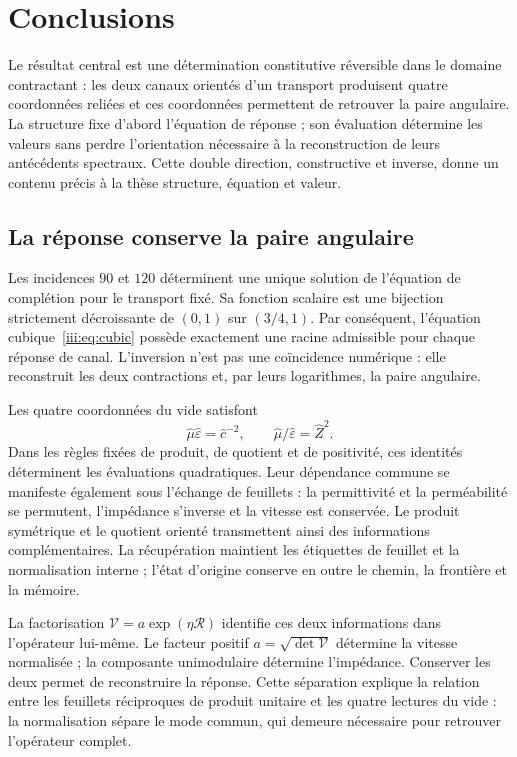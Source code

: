 \section{Conclusions}
\label{iii:sec:conclusiones}
\begingroup
\fontsize{10.5}{12.8}\selectfont
\setlength{\parskip}{2pt plus .5pt minus .5pt}

Le résultat central est une détermination constitutive réversible dans
le domaine contractant : les deux canaux orientés d’un transport
produisent quatre coordonnées reliées et ces coordonnées permettent de
retrouver la paire angulaire. La structure fixe d’abord l’équation de
réponse ; son évaluation détermine les valeurs sans perdre l’orientation
nécessaire à la reconstruction de leurs antécédents spectraux. Cette double
direction, constructive et inverse, donne un contenu précis à la thèse
structure, équation et valeur.

\subsection*{La réponse conserve la paire angulaire}

Les incidences $90$ et $120$ déterminent une unique solution de
l’équation de complétion pour le transport fixé. Sa fonction scalaire
est une bijection strictement décroissante de $(0,1)$ sur $(3/4,1)$.
Par conséquent, l’équation cubique~\eqref{iii:eq:cubic} possède exactement
une racine admissible pour chaque réponse de canal. L’inversion n’est pas
une coïncidence numérique : elle reconstruit les deux contractions et, par
leurs logarithmes, la paire angulaire.

Les quatre coordonnées du vide satisfont
\[
\widehat\mu\widehat\varepsilon=\widehat c^{-2},\qquad
\widehat\mu/\widehat\varepsilon=\widehat Z^2.
\]
Dans les règles fixées de produit, de quotient et de positivité, ces
identités déterminent les évaluations quadratiques. Leur dépendance
commune se manifeste également sous l’échange de feuillets : la permittivité et
la perméabilité se permutent, l’impédance s’inverse et la vitesse est
conservée. Le produit symétrique et le quotient orienté transmettent ainsi
des informations complémentaires. La récupération maintient les étiquettes
de feuillet et la normalisation interne ; l’état d’origine conserve
en outre le chemin, la frontière et la mémoire.

La factorisation $\mathcal V=a\exp(\eta\mathcal R)$ identifie
ces deux informations dans l’opérateur lui-même. Le facteur positif
$a=\sqrt{\det\mathcal V}$ détermine la vitesse normalisée ;
la composante unimodulaire détermine l’impédance. Conserver les deux
permet de reconstruire la réponse. Cette séparation explique la relation
entre les feuillets réciproques de produit unitaire et les quatre lectures
du vide : la normalisation sépare le mode commun, qui demeure
nécessaire pour retrouver l’opérateur complet.

